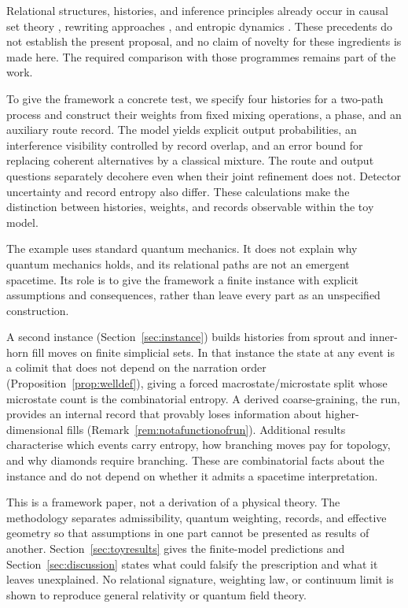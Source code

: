 Relational structures, histories, and inference principles already occur in
causal set theory \citep{bombelli1987,rideout2000csg,surya2019living},
rewriting approaches \citep{gorard2020}, and entropic dynamics
\citep{caticha2011}. These precedents do not establish the present proposal,
and no claim of novelty for these ingredients is made here. The required
comparison with those programmes remains part of the work.

To give the framework a concrete test, we specify four histories for a
two-path process and construct their weights from fixed mixing operations,
a phase, and an auxiliary route record. The model yields explicit output
probabilities, an interference visibility controlled by record overlap,
and an error bound for replacing coherent alternatives by a classical
mixture. The route and output questions separately decohere even when
their joint refinement does not. Detector uncertainty and record entropy
also differ. These calculations make the distinction between histories,
weights, and records observable within the toy model.

The example uses standard quantum mechanics. It does not explain why
quantum mechanics holds, and its relational paths are not an emergent
spacetime. Its role is to give the framework a finite instance with
explicit assumptions and consequences, rather than leave every part as an
unspecified construction.

A second instance (Section~\ref{sec:instance}) builds histories from
sprout and inner-horn fill moves on finite simplicial sets. In that
instance the state at any event is a colimit that does not depend on the
narration order (Proposition~\ref{prop:welldef}), giving a forced
macrostate/microstate split whose microstate count is the combinatorial
entropy. A derived coarse-graining, the run, provides an internal record
that provably loses information about higher-dimensional fills
(Remark~\ref{rem:notafunctionofrun}). Additional results characterise
which events carry entropy, how branching moves pay for topology, and
why diamonds require branching. These are combinatorial facts about the
instance and do not depend on whether it admits a spacetime
interpretation.

This is a framework paper, not a derivation of a physical theory. The
methodology separates admissibility, quantum weighting, records, and
effective geometry so that assumptions in one part cannot be presented as
results of another. Section~\ref{sec:toyresults} gives the finite-model
predictions and Section~\ref{sec:discussion} states what could falsify the
prescription and what it leaves unexplained. No relational signature,
weighting law, or continuum limit is shown to reproduce general relativity
or quantum field theory.
